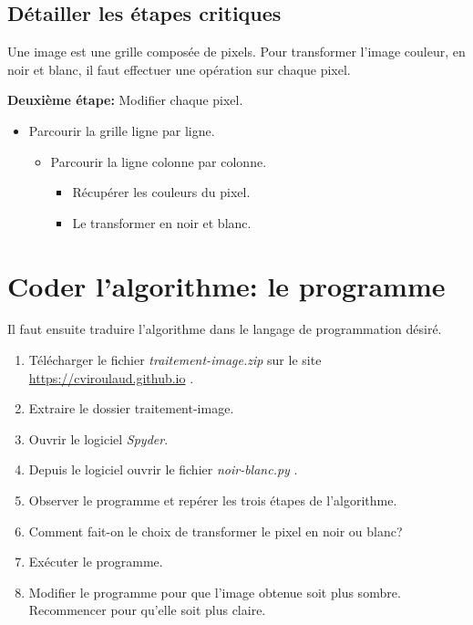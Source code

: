\documentclass[a4paper,11pt]{article}
\begin{document}
\begin{Form}
\subsection{Détailler les étapes critiques}
Une image est une grille composée de pixels. Pour transformer l'image couleur, en noir et blanc, il faut effectuer une opération sur chaque pixel.
\begin{center}
\label{matrice}
\end{center}

\textbf{Deuxième étape:} Modifier chaque pixel.
\begin{itemize}
\item Parcourir la grille ligne par ligne.
\begin{itemize}
\item Parcourir la ligne colonne par colonne.
\begin{itemize}
\item Récupérer les couleurs du pixel.
\item Le transformer en noir et blanc.
\end{itemize}
\end{itemize}
\end{itemize}
\section{Coder l'algorithme: le programme}
Il faut ensuite traduire l'algorithme dans le langage de programmation désiré.
\begin{activite}
\begin{enumerate}
\item Télécharger le fichier \emph{traitement-image.zip} sur le site \url{https://cviroulaud.github.io} .
\item Extraire le dossier traitement-image.
\item Ouvrir le logiciel \emph{Spyder}.
\item Depuis le logiciel ouvrir le fichier \emph{noir-blanc.py} .
\item Observer le programme et repérer les trois étapes de l'algorithme.
\item Comment fait-on le choix de transformer le pixel en noir ou blanc?
\item Exécuter le programme.
\item Modifier le programme pour que l'image obtenue soit plus sombre. Recommencer pour qu'elle soit plus claire.
\end{enumerate}
\end{activite}

\end{Form}
\end{document}
